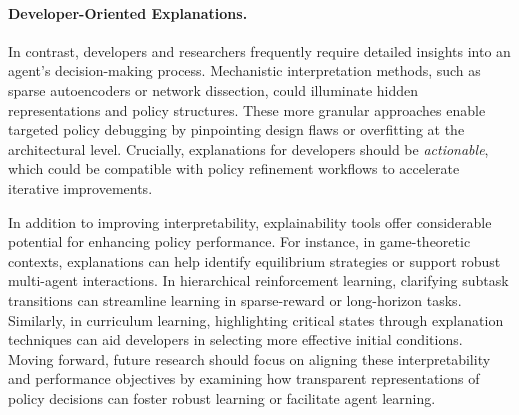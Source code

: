 \paragraph{Developer-Oriented Explanations. }
In contrast, developers and researchers frequently require detailed insights into an agent’s decision-making process. Mechanistic interpretation methods, such as sparse autoencoders or network dissection, could illuminate hidden representations and policy structures. These more granular approaches enable targeted policy debugging by pinpointing design flaws or overfitting at the architectural level. Crucially, explanations for developers should be \emph{actionable}, which could be compatible with policy refinement workflows to accelerate iterative improvements.

In addition to improving interpretability, explainability tools offer considerable potential for enhancing policy performance. For instance, in game-theoretic contexts, explanations can help identify equilibrium strategies or support robust multi-agent interactions. In hierarchical reinforcement learning, clarifying subtask transitions can streamline learning in sparse-reward or long-horizon tasks. Similarly, in curriculum learning, highlighting critical states through explanation techniques can aid developers in selecting more effective initial conditions. Moving forward, future research should focus on aligning these interpretability and performance objectives by examining how transparent representations of policy decisions can foster robust learning or facilitate agent learning.
